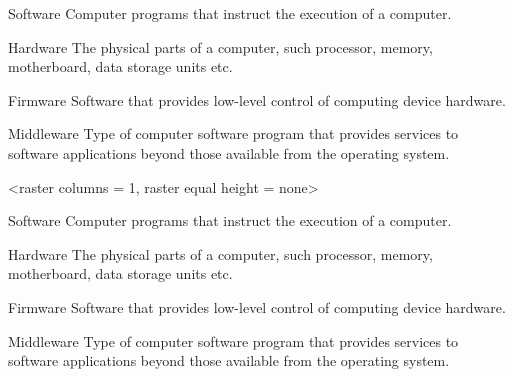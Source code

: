 \documentclass[a4paper, 11pt]{article}
\begin{document}
\begin{tcblisting}{}
    \begin{PLTBoxItemize}
        \item[Software] Computer programs that instruct the execution of a computer.
        \item[Hardware] The physical parts of a computer, such processor, memory, motherboard, data storage units etc.
        \item[Firmware] Software that provides low-level control of computing device hardware.
        \item[Middleware] Type of computer software program that provides services to software applications beyond those available from the operating system.
    \end{PLTBoxItemize}
\end{tcblisting}

\begin{tcblisting}{}
    \begin{PLTBoxItemize}
        <raster columns = 1, raster equal height = none>
        \item[Software] Computer programs that instruct the execution of a computer.
        \item[Hardware] The physical parts of a computer, such processor, memory, motherboard, data storage units etc.
        \item[Firmware] Software that provides low-level control of computing device hardware.
        \item[Middleware] Type of computer software program that provides services to software applications beyond those available from the operating system.
    \end{PLTBoxItemize}
\end{tcblisting}
\end{document}
